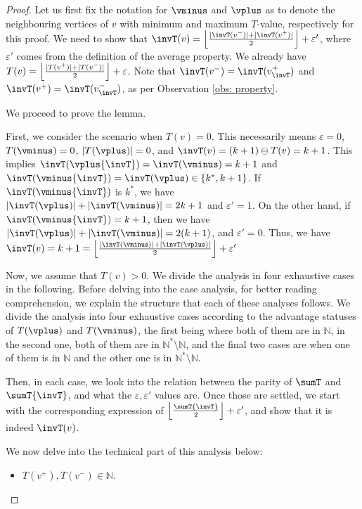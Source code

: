 \documentclass{article}\providecommand{\nequiv}{\not\equiv}\usepackage[a4paper,margin=20mm]{geometry}
\newcommand{\Nat}{\mathbb{N}}
\newcommand{\Natstro}{\mathbb{N}^* \setminus \mathbb{N}}
\newcommand{\eps}{\varepsilon}
\DeclarePairedDelimiter{\adjustfloor}{\lfloor}{\rfloor}
\newcommand{\floor}[1]{\adjustfloor*{#1}}
\begin{document}
\begin{proof}
	Let us first fix the notation for \(\vminus\) and \(\vplus\) as to denote the neighbouring vertices of \(v\) with minimum and maximum \(T\)-value, respectively for this proof.  
	We need to show that \(\invT(v) = \floor{\frac{|\invT(v^-)|+ |\invT(v^+)|}{2}} + \eps'\), where \(\eps'\) comes from the definition of the average property.
	We already have \(T(v) = \floor{\frac{|T(v^+)|+ |T(v^-)|}{2}} + \eps\).
	Note that \(\invT(v^-) = \invT(v^+_{\invT})\) and \(\invT(v^+) = \invT(v^-_{\invT})\), as per Observation \ref{obs: property}.  
	
We proceed to prove the lemma. 

First, we consider the scenario when \(T(v) = 0\). 
This necessarily means \(\eps = 0\), \(T(\vminus) = 0\), \(|T(\vplus)| = 0\), and \(\invT(v) = (k+1) \ominus T(v) = k+1\). 
This implies \(\invT(\vplus{\invT}) = \invT(\vminus) = k+1\) and \(\invT(\vminus{\invT}) = \invT(\vplus) \in \{k^*, k+1\}\). 
If \(\invT(\vminus{\invT})\) is \(k^*\), we have \(|\invT(\vplus)| + |\invT(\vminus)| = 2k+1\) and \(\eps' = 1\). 
On the other hand, if \(\invT(\vminus{\invT}) = k+1\), then we have \(|\invT(\vplus)| + |\invT(\vminus)| = 2(k+1)\), and \(\eps' = 0\). 
Thus, we have \(\invT(v) = k+1 = \floor{\frac{\left|\invT\left(\vminus\right)\right| + \left|\invT\left(\vplus\right)\right|}{2}} + \eps'\)

\smallskip

Now, we assume that \(T(v) > 0\). We divide the analysis in four exhaustive cases in the following. 
Before delving into the case analysis, for better reading comprehension, we explain the structure that each of these analyses follows. 
We divide the analysis into four exhaustive cases according to the advantage statuses of \(T(\vplus)\) and \(T(\vminus)\), the first being where both of them are in \(\Nat\), in the second one, both of them are  in \(\Natstro\), and the final two cases are when one of them is in \(\Nat\) and the other one is in \(\Natstro\). 

Then, in each case, we look into the relation between  the parity of \(\sumT\) and \(\sumT{\invT}\), and what the \(\eps, \eps'\) values are. 
Once those are settled, we start with the corresponding expression of \(\floor{\frac{\sumT{\invT}}{2}} + \eps'\), and show that it is indeed \(\invT(v)\).

We now delve into the technical part of this analysis  below: 
	\begin{itemize}
		\item \(T(v^+), T(v^-) \in \Nat\).
		

\end{itemize}
\end{proof}
\end{document}
